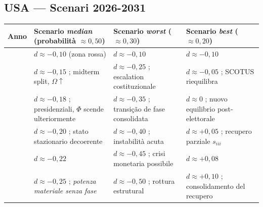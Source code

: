\subsection{USA --- Scenari 2026-2031}\label{usa-scenari-2026-2031}

{\def\LTcaptype{none} %
{\small\begin{longtable}[]{@{}
  >{\raggedright\arraybackslash}p{}
  >{\raggedright\arraybackslash}p{}
  >{\raggedright\arraybackslash}p{}
  >{\raggedright\arraybackslash}p{}@{}}
\toprule\noalign{}
\begin{minipage}[b]{\linewidth}\raggedright
Anno
\end{minipage} & \begin{minipage}[b]{\linewidth}\raggedright
Scenario \emph{median} (probabilità \(\approx 0{,}50\))
\end{minipage} & \begin{minipage}[b]{\linewidth}\raggedright
Scenario \emph{worst} (\(\approx 0{,}30\))
\end{minipage} & \begin{minipage}[b]{\linewidth}\raggedright
Scenario \emph{best} (\(\approx 0{,}20\))
\end{minipage} \\
\midrule\noalign{}
\endhead
\bottomrule\noalign{}
\endlastfoot
2026 & \(d \approx -0{,}10\) (zona rossa) & \(d \approx -0{,}10\) &
\(d \approx -0{,}10\) \\
2027 & \(d \approx -0{,}15\) ; midterm split, \(\Omega \uparrow\) &
\(d \approx -0{,}25\) ; escalation costituzionale &
\(d \approx -0{,}05\) ; SCOTUS riequilibra \\
2028 & \(d \approx -0{,}18\) ; presidenziali, \(\Phi\) scende
ulteriormente & \(d \approx -0{,}35\) ; transição de fase consolidata
& \(d \approx 0\) ; nuovo equilibrio post-elettorale \\
2029 & \(d \approx -0{,}20\) ; stato stazionario decoerente &
\(d \approx -0{,}40\) ; instabilità acuta & \(d \approx +0{,}05\) ;
recupero parziale \(s_{iii}\) \\
2030 & \(d \approx -0{,}22\) & \(d \approx -0{,}45\) ; crisi monetaria
possibile & \(d \approx +0{,}08\) \\
2031 & \(d \approx -0{,}25\) ; \emph{potenza materiale senza fase} &
\(d \approx -0{,}50\) ; rottura estrutural & \(d \approx +0{,}10\) ;
consolidamento del recupero \\
\end{longtable}}
}

